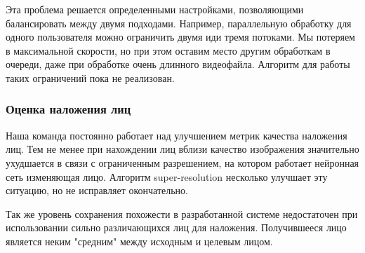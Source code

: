 Эта проблема решается определенными настройками, позволяющими балансировать между двумя подходами. Например, параллельную обработку для одного пользователя можно ограничить двумя иди тремя потоками. Мы потеряем в максимальной скорости, но при этом оставим место другим обработкам в очереди, даже при обработке очень длинного видеофайла. Алгоритм для работы таких ограничений пока не реализован.

\subsubsection{Оценка наложения лиц}

Наша команда постоянно работает над улучшением метрик качества наложения лиц. Тем не менее при нахождении лиц вблизи качество изображения значительно ухудшается в связи с ограниченным разрешением, на котором работает нейронная сеть изменяющая лицо. Алгоритм super-resolution несколько улучшает эту ситуацию, но не исправляет окончательно.

Так же уровень сохранения похожести в разработанной системе недостаточен при использовании сильно различающихся лиц для наложения. Получившееся лицо является неким "средним" между исходным и целевым лицом.